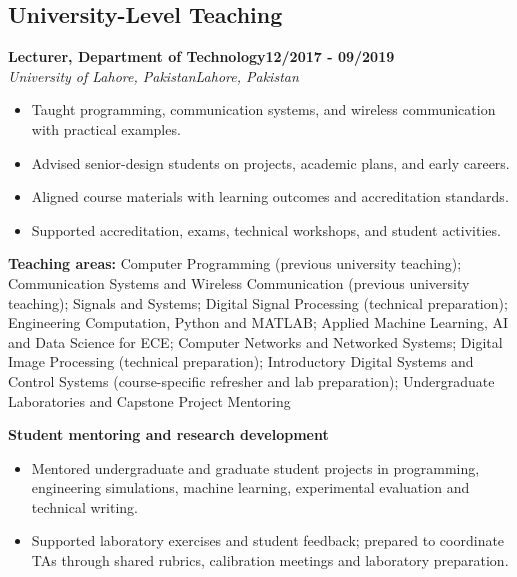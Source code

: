 \documentclass[8pt,letterpaper]{extarticle}
\newcommand{\role}[4]{%
  \Needspace{4\baselineskip}\textbf{#1}\hfill\textbf{#2}\\[-1pt]
  \textit{#3}\hfill\textit{#4}\par}
\begin{document}
\subsection{University-Level Teaching}
\role{Lecturer, Department of Technology}{12/2017 - 09/2019}{University of Lahore, Pakistan}{Lahore, Pakistan}
\begin{itemize}
\item Taught programming, communication systems, and wireless communication with practical examples.
\item Advised senior-design students on projects, academic plans, and early careers.
\item Aligned course materials with learning outcomes and accreditation standards.
\item Supported accreditation, exams, technical workshops, and student activities.
\end{itemize}
\vspace{1pt}
{\small\textbf{Teaching areas:} Computer Programming (previous university teaching); Communication Systems and Wireless Communication (previous university teaching); Signals and Systems; Digital Signal Processing (technical preparation); Engineering Computation, Python and MATLAB; Applied Machine Learning, AI and Data Science for ECE; Computer Networks and Networked Systems; Digital Image Processing (technical preparation); Introductory Digital Systems and Control Systems (course-specific refresher and lab preparation); Undergraduate Laboratories and Capstone Project Mentoring}\par
{}\noindent\textbf{Student mentoring and research development}\par
\begin{itemize}
\item Mentored undergraduate and graduate student projects in programming, engineering simulations, machine learning, experimental evaluation and technical writing.
\item Supported laboratory exercises and student feedback; prepared to coordinate TAs through shared rubrics, calibration meetings and laboratory preparation.
\end{itemize}
\end{document}
